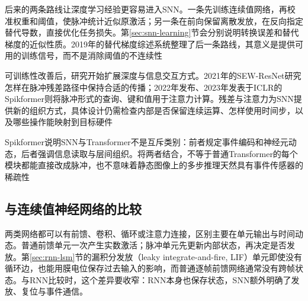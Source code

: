 后来的两条路线让深度学习经验更容易进入SNN。一条先训练连续值网络，再校准权重和阈值，使脉冲统计近似原激活；另一条在前向保留离散发放，在反向指定替代导数，直接优化任务损失。第\ref{sec:snn-learning}节会分别说明转换误差和替代梯度的近似性质。2019年的替代梯度综述系统整理了后一条路线，其意义是提供可用的训练信号，而不是消除阈值的不连续性

可训练性改善后，研究开始扩展深度与信息交互方式。2021年的SEW-ResNet研究怎样在脉冲残差路径中保持合适的传播；2022年发布、2023年发表于ICLR的Spikformer则将脉冲形式的查询、键和值用于注意力计算。残差与注意力为SNN提供新的组织方式，具体设计仍需检查内部是否保留连续运算、怎样使用时间步，以及哪些操作能映射到目标硬件

Spikformer说明SNN与Transformer不是互斥类别：前者规定事件编码和神经元动态，后者强调信息读取与层间组织。将两者结合，不等于普通Transformer的每个模块都能直接改成脉冲，也不意味着静态图像上的多步推理天然具有事件传感器的稀疏性

\subsection{与连续值神经网络的比较}
\label{sec:snn-ann-comparison}

两类网络都可以有前馈、卷积、循环或注意力连接，区别主要在单元输出与时间动态。普通前馈单元一次产生实数激活；脉冲单元先更新内部状态，再决定是否发放。第\ref{sec:rnn-lsm}节的漏积分发放（leaky integrate-and-fire, LIF）单元即使没有循环边，也能用膜电位保存过去输入的影响，而普通逐帧前馈网络通常没有跨帧状态。与RNN比较时，这个差异要收窄：RNN本身也保存状态，SNN额外明确了发放、复位与事件通信。

